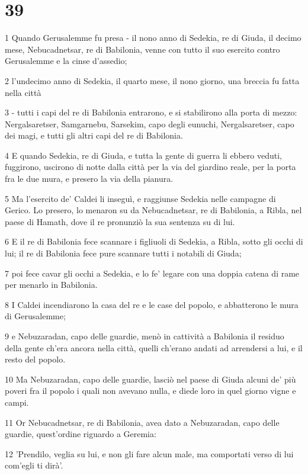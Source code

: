 \chapter{39}

\par 1 Quando Gerusalemme fu presa - il nono anno di Sedekia, re di Giuda, il decimo mese, Nebucadnetsar, re di Babilonia, venne con tutto il suo esercito contro Gerusalemme e la cinse d'assedio;
\par 2 l'undecimo anno di Sedekia, il quarto mese, il nono giorno, una breccia fu fatta nella città
\par 3 - tutti i capi del re di Babilonia entrarono, e si stabilirono alla porta di mezzo: Nergalsaretser, Samgarnebu, Sarsekim, capo degli eunuchi, Nergalsaretser, capo dei magi, e tutti gli altri capi del re di Babilonia.
\par 4 E quando Sedekia, re di Giuda, e tutta la gente di guerra li ebbero veduti, fuggirono, uscirono di notte dalla città per la via del giardino reale, per la porta fra le due mura, e presero la via della pianura.
\par 5 Ma l'esercito de' Caldei li inseguì, e raggiunse Sedekia nelle campagne di Gerico. Lo presero, lo menaron su da Nebucadnetsar, re di Babilonia, a Ribla, nel paese di Hamath, dove il re pronunziò la sua sentenza su di lui.
\par 6 E il re di Babilonia fece scannare i figliuoli di Sedekia, a Ribla, sotto gli occhi di lui; il re di Babilonia fece pure scannare tutti i notabili di Giuda;
\par 7 poi fece cavar gli occhi a Sedekia, e lo fe' legare con una doppia catena di rame per menarlo in Babilonia.
\par 8 I Caldei incendiarono la casa del re e le case del popolo, e abbatterono le mura di Gerusalemme;
\par 9 e Nebuzaradan, capo delle guardie, menò in cattività a Babilonia il residuo della gente ch'era ancora nella città, quelli ch'erano andati ad arrendersi a lui, e il resto del popolo.
\par 10 Ma Nebuzaradan, capo delle guardie, lasciò nel paese di Giuda alcuni de' più poveri fra il popolo i quali non avevano nulla, e diede loro in quel giorno vigne e campi.
\par 11 Or Nebucadnetsar, re di Babilonia, avea dato a Nebuzaradan, capo delle guardie, quest'ordine riguardo a Geremia:
\par 12 'Prendilo, veglia su lui, e non gli fare alcun male, ma comportati verso di lui com'egli ti dirà'.
